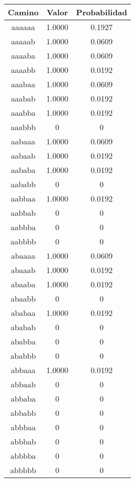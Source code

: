 \begin{figure}[hbpt]
\begin{minipage}{0.48\textwidth}
\begin{center}
\begin{tabular}{|c|c|c|}
\hline
\textbf{Camino} & \textbf{Valor} & \textbf{Probabilidad} \\
\hline
aaaaaa  &  1.0000  &  0.1927  \\
aaaaab  &  1.0000  &  0.0609  \\
aaaaba  &  1.0000  &  0.0609  \\
aaaabb  &  1.0000  &  0.0192  \\
aaabaa  &  1.0000  &  0.0609  \\
aaabab  &  1.0000  &  0.0192  \\
aaabba  &  1.0000  &  0.0192  \\
aaabbb  & 0 & 0 \\
aabaaa  &  1.0000  &  0.0609  \\
aabaab  &  1.0000  &  0.0192  \\
aababa  &  1.0000  &  0.0192  \\
aababb  & 0 & 0 \\
aabbaa  &  1.0000  &  0.0192  \\
aabbab  & 0 & 0 \\
aabbba  & 0 & 0 \\
aabbbb  & 0 & 0 \\
abaaaa  &  1.0000  &  0.0609  \\
abaaab  &  1.0000  &  0.0192  \\
abaaba  &  1.0000  &  0.0192  \\
abaabb  & 0 & 0 \\
ababaa  &  1.0000  &  0.0192  \\
ababab  & 0 & 0 \\
ababba  & 0 & 0 \\
ababbb  & 0 & 0 \\
abbaaa  &  1.0000  &  0.0192  \\
abbaab  & 0 & 0 \\
abbaba  & 0 & 0 \\
abbabb  & 0 & 0 \\
abbbaa  & 0 & 0 \\
abbbab  & 0 & 0 \\
abbbba  & 0 & 0 \\
abbbbb  & 0 & 0 \\
\hline
\end{tabular}
\end{center}
\end{minipage}

\end{figure}
